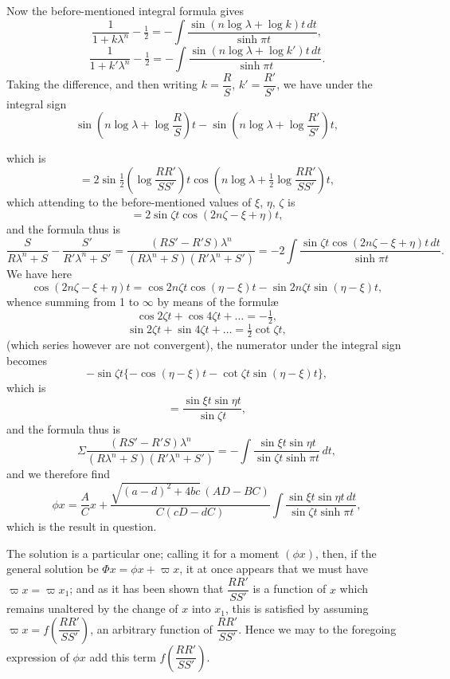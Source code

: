 \documentclass[11pt,a4paper]{article}
\begin{document}
\medskip

Now the before-mentioned integral formula gives
\[
\frac{1}{1 + k\lambda^{n}} - \tfrac{1}{2} = -\int\frac{\sin(n\log\lambda + \log k)t\,dt}{\sinh\pi t},
\]
\[
\frac{1}{1 + k'\lambda^{n}} - \tfrac{1}{2} = -\int\frac{\sin(n\log\lambda + \log k')t\,dt}{\sinh\pi t}.
\]
Taking the difference, and then writing $k = \dfrac{R}{S}$, $k' = \dfrac{R'}{S'}$, we have under the integral sign
\[
\sin\left(n\log\lambda + \log\frac{R}{S}\right)t - \sin\left(n\log\lambda + \log\frac{R'}{S'}\right)t,
\]

\newpage


which is
\[
= 2\sin\tfrac{1}{2}\left(\log\frac{RR'}{SS'}\right)t\cos\left(n\log\lambda + \tfrac{1}{2}\log\frac{RR'}{SS'}\right)t,
\]
which attending to the before-mentioned values of $\xi$, $\eta$, $\zeta$ is
\[
= 2\sin\zeta t\cos(2n\zeta - \xi + \eta)t,
\]
and the formula thus is
\[
\frac{S}{R\lambda^{n} + S} - \frac{S'}{R'\lambda^{n} + S'} = \frac{(RS' - R'S)\lambda^{n}}{(R\lambda^{n} + S)(R'\lambda^{n} + S')} = -2\int\frac{\sin\zeta t\cos(2n\zeta - \xi + \eta)t\,dt}{\sinh\pi t}.
\]
We have here
\[
\cos(2n\zeta - \xi + \eta)t = \cos 2n\zeta t\cos(\eta - \xi)t - \sin 2n\zeta t\sin(\eta - \xi)t,
\]
whence summing from 1 to $\infty$ by means of the formul\ae{}
\[
\cos 2\zeta t + \cos 4\zeta t + \ldots = -\tfrac{1}{2},
\]
\[
\sin 2\zeta t + \sin 4\zeta t + \ldots = \tfrac{1}{2}\cot\zeta t,
\]
(which series however are not convergent), the numerator under the integral sign becomes
\[
-\sin\zeta t\{-\cos(\eta - \xi)t - \cot\zeta t\sin(\eta - \xi)t\},
\]
which is
\[
= \frac{\sin\xi t\sin\eta t}{\sin\zeta t},
\]
and the formula thus is
\[
\Sigma\frac{(RS' - R'S)\lambda^{n}}{(R\lambda^{n} + S)(R'\lambda^{n} + S')} = -\int\frac{\sin\xi t\sin\eta t}{\sin\zeta t\sinh\pi t}\,dt,
\]
and we therefore find
\[
\phi x = \frac{A}{C}x + \frac{\sqrt{(a - d)^{2} + 4bc}\,(AD - BC)}{C(cD - dC)}\int\frac{\sin\xi t\sin\eta t\,dt}{\sin\zeta t\sinh\pi t},
\]
which is the result in question.

\medskip

The solution is a particular one; calling it for a moment $(\phi x)$, then, if the general solution be $\Phi x = \phi x + \varpi x$, it at once appears that we must have $\varpi x = \varpi x_{1}$; and as it has been shown that $\dfrac{RR'}{SS'}$ is a function of $x$ which remains unaltered by the change of $x$ into $x_{1}$, this is satisfied by assuming $\varpi x = f\left(\dfrac{RR'}{SS'}\right)$, an arbitrary function of $\dfrac{RR'}{SS'}$. Hence we may to the foregoing expression of $\phi x$ add this term $f\left(\dfrac{RR'}{SS'}\right)$.
\end{document}

